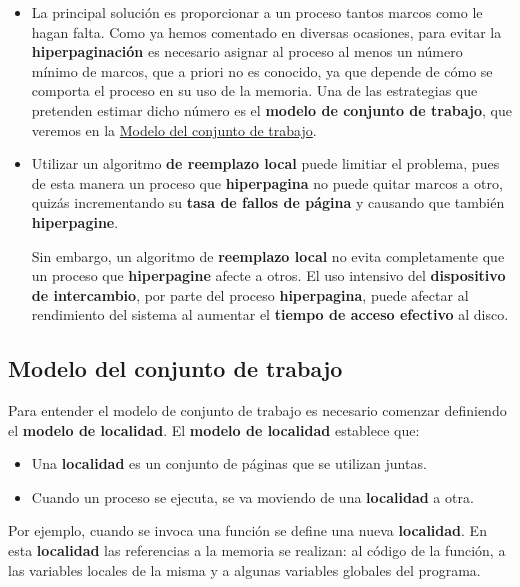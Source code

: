 \begin{itemize}
\item
  La principal solución es proporcionar a un proceso tantos marcos como
  le hagan falta. Como ya hemos comentado en diversas ocasiones, para
  evitar la \textbf{hiperpaginación} es necesario asignar al proceso al
  menos un número mínimo de marcos, que a priori no es conocido, ya que
  depende de cómo se comporta el proceso en su uso de la memoria. Una de
  las estrategias que pretenden estimar dicho número es el
  \textbf{modelo de conjunto de trabajo}, que veremos en la
  \hyperref[_modelo_del_conjunto_de_trabajo]{Modelo del conjunto de
  trabajo}.
\item
  Utilizar un algoritmo \textbf{de reemplazo local} puede limitiar el
  problema, pues de esta manera un proceso que \textbf{hiperpagina} no
  puede quitar marcos a otro, quizás incrementando su \textbf{tasa de
  fallos de página} y causando que también \textbf{hiperpagine}.

  Sin embargo, un algoritmo de \textbf{reemplazo local} no evita
  completamente que un proceso que \textbf{hiperpagine} afecte a otros.
  El uso intensivo del \textbf{dispositivo de intercambio}, por parte
  del proceso \textbf{hiperpagina}, puede afectar al rendimiento del
  sistema al aumentar el \textbf{tiempo de acceso efectivo} al disco.
\end{itemize}

\subsection{Modelo del conjunto de
trabajo}\label{_modelo_del_conjunto_de_trabajo}

{} Para entender el modelo de conjunto de trabajo es necesario comenzar
definiendo el \textbf{modelo de localidad}{}. El \textbf{modelo de
localidad} establece que:

\begin{itemize}
\item
  Una \textbf{{}localidad} es un conjunto de páginas que se utilizan
  juntas.
\item
  Cuando un proceso se ejecuta, se va moviendo de una \textbf{localidad}
  a otra.
\end{itemize}

Por ejemplo, cuando se invoca una función se define una nueva
\textbf{localidad}. En esta \textbf{localidad} las referencias a la
memoria se realizan: al código de la función, a las variables locales de
la misma y a algunas variables globales del programa.

